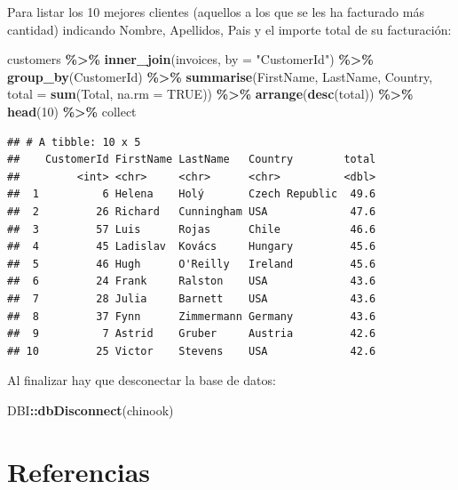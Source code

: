 \documentclass[
]{book}
\newenvironment{Shaded}{\begin{snugshade}}{\end{snugshade}}
\newcommand{\AttributeTok}[1]{\textcolor[rgb]{0.13,0.29,0.53}{#1}}
\newcommand{\ConstantTok}[1]{\textcolor[rgb]{0.56,0.35,0.01}{#1}}
\newcommand{\DecValTok}[1]{\textcolor[rgb]{0.00,0.00,0.81}{#1}}
\newcommand{\FunctionTok}[1]{\textcolor[rgb]{0.13,0.29,0.53}{\textbf{#1}}}
\newcommand{\NormalTok}[1]{#1}
\newcommand{\SpecialCharTok}[1]{\textcolor[rgb]{0.81,0.36,0.00}{\textbf{#1}}}
\newcommand{\StringTok}[1]{\textcolor[rgb]{0.31,0.60,0.02}{#1}}
\theoremstyle{break}
\theoremstyle{nonumberplain}
\begin{document}
Para listar los 10 mejores clientes (aquellos a los que se les ha facturado más cantidad) indicando Nombre, Apellidos, Pais y el importe total de su facturación:

\begin{Shaded}
\begin{Highlighting}[]
\NormalTok{customers }\SpecialCharTok{\%\textgreater{}\%} \FunctionTok{inner\_join}\NormalTok{(invoices, }\AttributeTok{by =} \StringTok{"CustomerId"}\NormalTok{) }\SpecialCharTok{\%\textgreater{}\%} \FunctionTok{group\_by}\NormalTok{(CustomerId) }\SpecialCharTok{\%\textgreater{}\%} 
    \FunctionTok{summarise}\NormalTok{(FirstName, LastName, Country, }\AttributeTok{total =} \FunctionTok{sum}\NormalTok{(Total, }\AttributeTok{na.rm =} \ConstantTok{TRUE}\NormalTok{)) }\SpecialCharTok{\%\textgreater{}\%}  
    \FunctionTok{arrange}\NormalTok{(}\FunctionTok{desc}\NormalTok{(total)) }\SpecialCharTok{\%\textgreater{}\%} \FunctionTok{head}\NormalTok{(}\DecValTok{10}\NormalTok{) }\SpecialCharTok{\%\textgreater{}\%}\NormalTok{ collect}
\end{Highlighting}
\end{Shaded}

\begin{verbatim}
## # A tibble: 10 x 5
##    CustomerId FirstName LastName   Country        total
##         <int> <chr>     <chr>      <chr>          <dbl>
##  1          6 Helena    Holý       Czech Republic  49.6
##  2         26 Richard   Cunningham USA             47.6
##  3         57 Luis      Rojas      Chile           46.6
##  4         45 Ladislav  Kovács     Hungary         45.6
##  5         46 Hugh      O'Reilly   Ireland         45.6
##  6         24 Frank     Ralston    USA             43.6
##  7         28 Julia     Barnett    USA             43.6
##  8         37 Fynn      Zimmermann Germany         43.6
##  9          7 Astrid    Gruber     Austria         42.6
## 10         25 Victor    Stevens    USA             42.6
\end{verbatim}

Al finalizar hay que desconectar la base de datos:

\begin{Shaded}
\begin{Highlighting}[]
\NormalTok{DBI}\SpecialCharTok{::}\FunctionTok{dbDisconnect}\NormalTok{(chinook)            }
\end{Highlighting}
\end{Shaded}

\chapter*{Referencias}\label{referencias}
\end{document}
